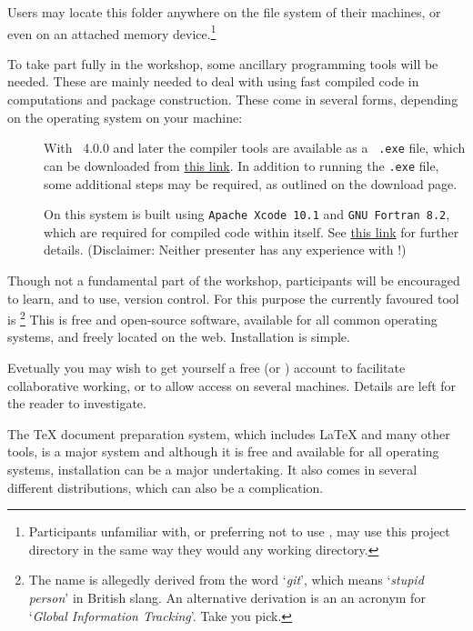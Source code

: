 \documentclass[12pt]{article}
\begin{document}
\begin{description}
  Users may locate this folder anywhere on the file system of their
  machines, or even on an attached memory
  device.\footnote{Participants unfamiliar with, or preferring not to
    use \RStudio, may use this project directory in the same way they
    would any \R working directory.}
\item[Other tools used with \R] To take part fully in the workshop,
  some ancillary programming tools will be needed.  These are mainly
  needed to deal with using fast compiled code in computations and
  package construction. These come in several forms, depending on the
  operating system on your machine:
  \begin{description}
  \item[\Windows] With \R~4.0.0 and later the compiler tools are
    available as a \Windows~\verb|.exe| file, which can be downloaded
    from \href{https://cloud.r-project.org/bin/windows/Rtools/}{this
      link}.  In addition to running the \verb|.exe| file, some
    additional steps may be required, as outlined on the download
    page.
  \item[\MacOS] On this system \R is built using
    \verb|Apache Xcode 10.1| and \verb|GNU Fortran 8.2|, which are
    required for compiled code within \R itself.  See
    \href{https://cloud.r-project.org/bin/macosx/tools/}{this link}
    for further details. (Disclaimer: Neither presenter has any
    experience with \MacOS!)
  \end{description}
\item[Version control] Though not a fundamental part of the workshop,
  participants will be encouraged to learn, and to use, version
  control.  For this purpose the currently favoured tool is
  \git\footnote{The name is allegedly derived from the word
    `\emph{git}', which means `\emph{stupid person}' in British slang.
    An alternative derivation is an an acronym for `\emph{Global
      Information Tracking}'.  Take you pick.}  This is free and
  open-source software, available for all common operating systems,
  and freely located on the web.  Installation is simple.

  Evetually you may wish to get yourself a free \github (or \gitlab)
  account to facilitate collaborative working, or to allow access on
  several machines.  Details are left for the reader to investigate.
  
\item[\TeX{} and \LaTeX] The \TeX{} document preparation system, which
  includes \LaTeX{} and many other tools, is a major system and
  although it is free and available for all operating systems,
  installation can be a major undertaking.  It also comes in several
  different distributions, which can also be a complication.


\end{description}
\end{document}
